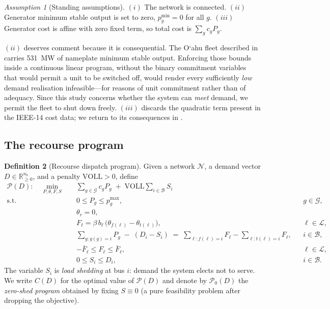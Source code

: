 \documentclass[11pt,a4paper]{article}
\theoremstyle{definition}
\newtheorem{definition}{Definition}[section]
\theoremstyle{plain}
\theoremstyle{remark}
\newtheorem{assumption}[definition]{Assumption}
\newcommand{\R}{\mathbb{R}}
\newcommand{\VOLL}{\mathrm{VOLL}}
\newcommand{\okina}{\textquoteleft}
\begin{document}
\begin{assumption}[Standing assumptions]\label{ass:standing}
$(i)$ The network is connected. $(ii)$ Generator minimum stable output is set to
zero, $p^{\min}_g = 0$ for all $g$. $(iii)$ Generator cost is affine with zero
fixed term, so total cost is $\sum_g c_g P_g$.
\end{assumption}

$(ii)$ deserves comment because it is consequential. The
O\okina ahu fleet described in  carries \SI{531}{\mega\watt} of
nameplate minimum stable output. Enforcing those bounds inside a continuous
linear program, without the binary commitment variables that would permit a unit
to be switched off, would render every sufficiently \emph{low} demand
realisation infeasible---for reasons of unit commitment rather than of adequacy.
Since this study concerns whether the system can \emph{meet} demand, we permit
the fleet to shut down freely. $(iii)$ discards the quadratic
term present in the IEEE-14 cost data; we return to its consequences in
.

\subsection{The recourse program}

\begin{definition}[Recourse dispatch program]\label{def:program}
Given a network $\mathcal{N}$, a demand vector $D \in \R^{n_b}_{\ge 0}$, and a
penalty $\VOLL > 0$, define
\begin{subequations}\label{eq:lp}
\begin{align}
\mathcal{P}(D):\quad
\min_{P,\theta,F,S}\quad & \sum_{g\in\mathcal{G}} c_g P_g \;+\; \VOLL \sum_{i\in\mathcal{B}} S_i
  \label{eq:obj}\\
\text{s.t.}\quad
& 0 \le P_g \le p^{\max}_g, && g \in \mathcal{G}, \label{eq:gen}\\
& \theta_r = 0, \label{eq:slack}\\
& F_\ell = \beta\, b_\ell\,\bigl(\theta_{f(\ell)} - \theta_{t(\ell)}\bigr),
  && \ell \in \mathcal{L}, \label{eq:flow}\\
& \sum_{g : g(g)=i} P_g \;-\; (D_i - S_i)
   \;=\; \sum_{\ell : f(\ell)=i} F_\ell - \sum_{\ell : t(\ell)=i} F_\ell,
  && i \in \mathcal{B}, \label{eq:balance}\\
& -\bar F_\ell \le F_\ell \le \bar F_\ell, && \ell \in \mathcal{L}, \label{eq:thermal}\\
& 0 \le S_i \le D_i, && i \in \mathcal{B}. \label{eq:shed}
\end{align}
\end{subequations}
The variable $S_i$ is \emph{load shedding} at bus $i$: demand the system elects
not to serve. We write $C(D)$ for the optimal value of $\mathcal{P}(D)$ and
denote by $\mathcal{P}_0(D)$ the \emph{zero-shed program} obtained by fixing
$S \equiv 0$ (a pure feasibility problem after dropping the objective).
\end{definition}
\end{document}

